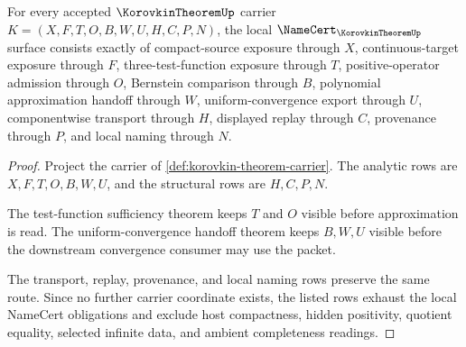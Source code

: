 \begin{theorem}
\label{thm:korovkin-theorem-namecert-obligations}
For every accepted $\KorovkinTheoremUp$ carrier $K=(X,F,T,O,B,W,U,H,C,P,N)$, the local $\NameCert_{\KorovkinTheoremUp}$ surface consists exactly of compact-source exposure through $X$, continuous-target exposure through $F$, three-test-function exposure through $T$, positive-operator admission through $O$, Bernstein comparison through $B$, polynomial approximation handoff through $W$, uniform-convergence export through $U$, componentwise transport through $H$, displayed replay through $C$, provenance through $P$, and local naming through $N$.
\end{theorem}
\begin{proof}
Project the carrier of \autoref{def:korovkin-theorem-carrier}. The analytic rows are $X,F,T,O,B,W,U$, and the structural rows are $H,C,P,N$.

The test-function sufficiency theorem keeps $T$ and $O$ visible before approximation is read. The uniform-convergence handoff theorem keeps $B,W,U$ visible before the downstream convergence consumer may use the packet.

The transport, replay, provenance, and local naming rows preserve the same route. Since no further carrier coordinate exists, the listed rows exhaust the local NameCert obligations and exclude host compactness, hidden positivity, quotient equality, selected infinite data, and ambient completeness readings.
\end{proof}




